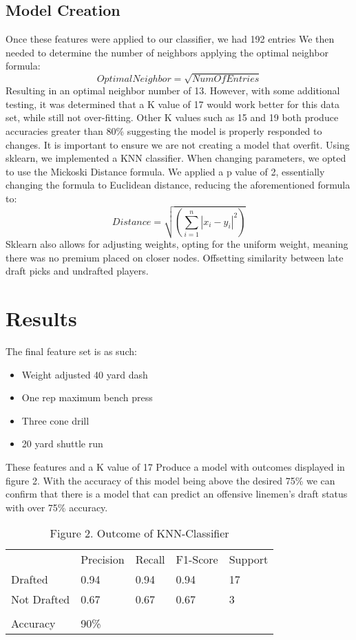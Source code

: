 \documentclass[confrence]{IEEEtran}
\begin{document}
\subsection*{Model Creation}
Once these features were applied to our classifier, we had 192 entries
We then needed to determine the number of neighbors applying the optimal neighbor formula: \[OptimalNeighbor = \sqrt{NumOfEntries}\]
Resulting in an optimal neighbor number of 13.
However, with some additional testing, it was determined that a K value of 17 would work better for this data set, while still not over-fitting.
Other K values such as 15 and 19 both produce accuracies greater than 80\% suggesting the model is properly responded to changes.
It is important to ensure we are not creating a model that overfit.
Using sklearn, we implemented a KNN classifier. When changing parameters, we opted to use the Mickoski Distance formula.
We applied a p value of 2, essentially changing the formula to Euclidean distance, reducing the aforementioned formula to:
\[Distance = \sqrt{(\sum_{i=1}^n|x_i-y_i|^2)}\]
Sklearn also allows for adjusting weights, opting for the uniform weight, meaning there was no premium placed on closer nodes.
Offsetting similarity between late draft picks and undrafted players.
\section*{Results}
The final feature set is as such:
\begin{itemize}
    \item Weight adjusted 40 yard dash
    \item One rep maximum bench press
    \item Three cone drill
    \item 20 yard shuttle run
\end{itemize}
These features and a K value of 17 Produce a model with outcomes displayed in figure 2.
With the accuracy of this model being above the desired 75\% we can confirm that there is a model that can predict an offensive linemen's draft status with over 75\% accuracy.
\begin{table}[htbp]
    \begin{tabular}{lllll}
                    & Precision & Recall & F1-Score & Support \\
        Drafted     & 0.94      & 0.94   & 0.94     & 17      \\
        Not Drafted & 0.67      & 0.67   & 0.67     & 3       \\
                    &           &        &          &         \\
        Accuracy    & 90\%      &        &          &         \\
    \end{tabular}
    \caption{Figure 2. Outcome of KNN-Classifier}
\end{table}
\end{document}
